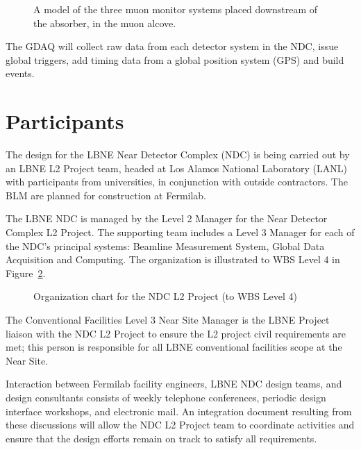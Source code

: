 \begin{figure}[htbp]
\begin{center}
\caption[Layout of muon monitors]
{A model of the three muon monitor systems placed downstream of the absorber, in the muon alcove. }
\label{fig:MuonSystemsOverview}
\end{center}
\end{figure}

The GDAQ will collect raw data from each
detector system in the NDC, issue global triggers, add timing data
from a global position system (GPS) and build events.


\section{Participants}

The design for the LBNE Near Detector Complex (NDC) is being carried out by an LBNE L2 Project team, headed at Los Alamos National Laboratory (LANL) 
with participants from universities, in conjunction with outside contractors.  
The BLM are planned for construction at 
Fermilab.

The LBNE NDC is managed by the 
Level 2 Manager for the Near Detector Complex L2 Project. The supporting team 
includes a Level 3 
Manager for each of the NDC's principal systems: Beamline Measurement System, Global Data Acquisition and Computing. The organization is illustrated to WBS Level 4 in Figure~\ref{fig:nd-org}.

\begin{figure}
\begin{center}
\caption[Organization chart for the NDC L2 Project to L4]{\label{fig:nd-org} Organization chart for the NDC L2 Project (to WBS Level 4)}
\end{center}
\end{figure}


The Conventional Facilities Level 3 Near Site Manager is the LBNE Project liaison with the NDC L2 Project 
to ensure the L2 project civil requirements are met; 
this person is responsible for all LBNE conventional facilities scope at the Near Site. 

Interaction between Fermilab facility engineers, LBNE NDC design teams, and
design consultants consists of 
weekly telephone conferences, periodic design interface workshops, and
electronic mail. An integration document resulting from these discussions will allow the NDC L2 Project team to coordinate activities and ensure that the design efforts remain on track to satisfy all requirements.


